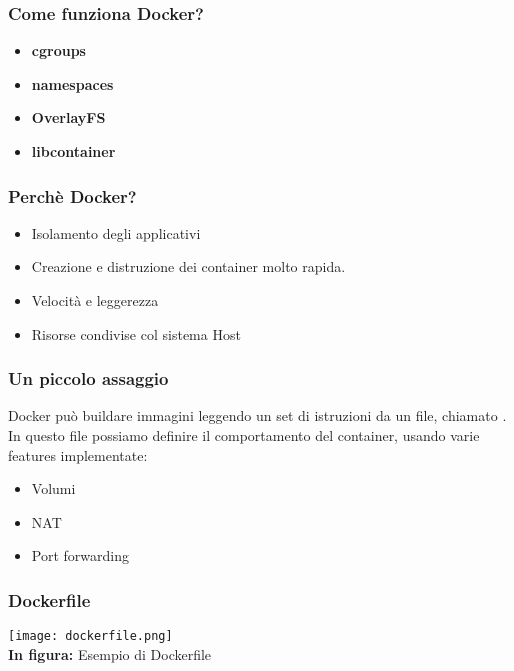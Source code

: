 \documentclass{beamer}
\begin{document}

\begin{frame}
    \frametitle{Come funziona Docker?} 
    \begin{itemize}
        \item<1-> \textbf{cgroups}
        \item<2-> \textbf{namespaces}
        \item<3-> \textbf{OverlayFS}
        \item<4-> \textbf{libcontainer}
    \end{itemize}
\end{frame}


\begin{frame}
    \frametitle{Perch\`e Docker?}
    \begin{itemize}
        \item<1-> Isolamento degli applicativi
        \item<2-> Creazione e distruzione dei container molto rapida. 
        \item<3-> Velocit\`a e leggerezza
        \item<4-> Risorse condivise col sistema Host
    \end{itemize}
\end{frame}


\begin{frame}
    \frametitle{Un piccolo assaggio}
    Docker pu\`o buildare immagini leggendo un set di istruzioni da un file, chiamato .
    In questo file possiamo definire il comportamento del container, usando varie features implementate:
    \begin{itemize}
        \item<1-> Volumi
        \item<2-> NAT 
        \item<3-> Port forwarding
    \end{itemize}
\end{frame}


\begin{frame}
    \frametitle{Dockerfile}
    \begin{center}
        \texttt{[image: dockerfile.png]}
        \\ \textbf{In figura:} Esempio di Dockerfile
    \end{center}
\end{frame}
\end{document}

